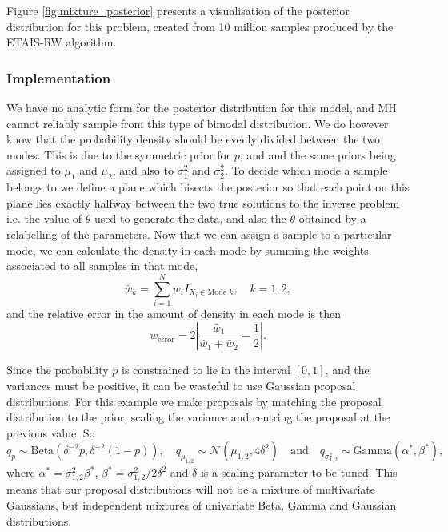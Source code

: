 \documentclass[final]{siamltex}
\begin{document}
Figure \ref{fig:mixture_posterior} presents a visualisation of the
posterior distribution for this problem, created from 10 million
samples produced by the ETAIS-RW algorithm.


\subsubsection{Implementation}
\label{sec:mixture_implementation}

We have no analytic form for the posterior distribution for this
model, and MH cannot reliably sample from this type of bimodal
distribution. We do however know that the probability density should
be evenly divided between the two modes. This is due to the symmetric
prior for $p$, and and the same priors being assigned to $\mu_1$ and
$\mu_2$, and also to $\sigma^2_1$ and $\sigma^2_2$. To decide which
mode a sample belongs to we define a plane which bisects the posterior
so that each point on this plane lies exactly halfway between the two
true solutions to the inverse problem i.e. the value of $\theta$ used
to generate the data, and also the $\theta$ obtained by a relabelling
of the parameters. Now that we can assign a sample to a particular
mode, we can calculate the density in each mode by summing the weights
associated to all samples in that mode,
\[
	\bar{w}_k = \sum\limits_{i=1}^N w_iI_{X_i \in \text{Mode $k$}}, \quad k = 1, 2,
\]
and the relative error in the amount of density in each mode is then
\begin{equation}\label{eqn:mode_prop}
	w_\text{error} = 2\left|\frac{\bar{w}_1}{\bar{w}_1+\bar{w}_2} - \frac{1}{2}\right|.
\end{equation}

Since the probability $p$ is constrained to lie in the interval
$[0,1]$, and the variances must be positive, it can be wasteful to use
Gaussian proposal distributions. For this example we make proposals by
matching the proposal distribution to the prior, scaling the variance
and centring the proposal at the previous value. So
\[
	q_p \sim \text{Beta}(\delta^{-2}p, \delta^{-2}(1-p)), \quad q_{\mu_{1,2}} \sim \mathcal{N}(\mu_{1,2}, 4\delta^2) \quad \text{and} \quad q_{\sigma^2_{1,2}} \sim \text{Gamma}(\alpha^*, \beta^*),
\]
where $\alpha^* = \sigma^2_{1,2}\beta^*$, $\beta^* =
\sigma^2_{1,2}/2\delta^2$ and $\delta$ is a scaling parameter to be
tuned. This means that our proposal distributions will not be a
mixture of multivariate Gaussians, but independent mixtures of
univariate Beta, Gamma and Gaussian distributions.
\end{document}
